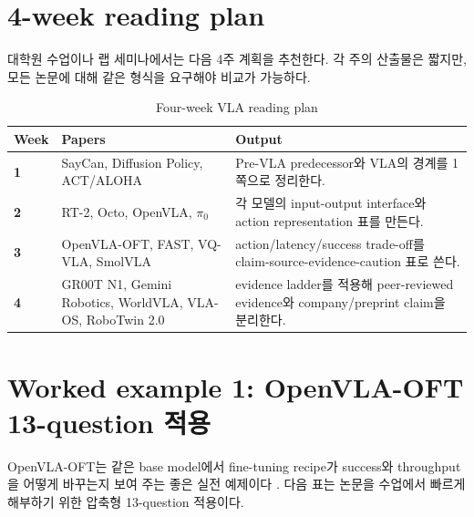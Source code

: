 \section{4-week reading plan}

대학원 수업이나 랩 세미나에서는 다음 4주 계획을 추천한다. 각 주의 산출물은 짧지만, 모든 논문에 대해 같은 형식을 요구해야 비교가 가능하다.

\begin{table}[t]
  \centering
  \caption{Four-week VLA reading plan}
  \label{tab:four_week_reading_plan}
  \begin{tabularx}{\textwidth}{>{\bfseries}p{14mm}p{56mm}X}
    \toprule
    Week & Papers & Output \\
    \midrule
    1 & SayCan, Diffusion Policy, ACT/ALOHA & Pre-VLA predecessor와 VLA의 경계를 1쪽으로 정리한다. \\
    2 & RT-2, Octo, OpenVLA, \(\pi_0\) & 각 모델의 input-output interface와 action representation 표를 만든다. \\
    3 & OpenVLA-OFT, FAST, VQ-VLA, SmolVLA & action/latency/success trade-off를 claim-source-evidence-caution 표로 쓴다. \\
    4 & GR00T N1, Gemini Robotics, WorldVLA, VLA-OS, RoboTwin 2.0 & evidence ladder를 적용해 peer-reviewed evidence와 company/preprint claim을 분리한다. \\
    \bottomrule
  \end{tabularx}
\end{table}

\section{Worked example 1: OpenVLA-OFT 13-question 적용}

OpenVLA-OFT는 같은 base model에서 fine-tuning recipe가 success와 throughput을 어떻게 바꾸는지 보여 주는 좋은 실전 예제이다 \citep{openvlaoft}. 다음 표는 논문을 수업에서 빠르게 해부하기 위한 압축형 13-question 적용이다.

